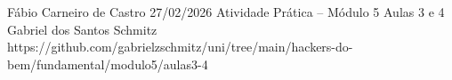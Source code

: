 \documentclass{article}
\begin{document}
{Fábio Carneiro de Castro}
{27/02/2026}
{Atividade Prática -- Módulo 5}
{Aulas 3 e 4}
{Gabriel dos Santos Schmitz}
{https://github.com/gabrielzschmitz/uni/tree/main/hackers-do-bem/fundamental/modulo5/aulas3-4}




\newpage
\printbibliography[title=Referências]
\end{document}

